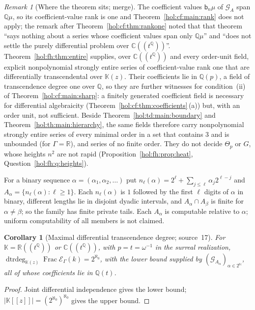 \documentclass[11pt]{article}
\numberwithin{equation}{section}
\newtheorem{corollary}[theorem]{Corollary}
\theoremstyle{definition}
\theoremstyle{remark}
\newtheorem{remark}[theorem]{Remark}
\newcommand{\C}{\mathbb C}
\newcommand{\R}{\mathbb R}
\newcommand{\Q}{\mathbb Q}
\newcommand{\N}{\mathbb N}
\newcommand{\abs}[1]{\lvert#1\rvert}
\newcommand{\KK}{\mathbb K}
\newcommand{\EK}{\mathcal E_\Gamma(k)}
\newcommand{\FE}{\operatorname{Frac}\EK}
\newcommand{\dtrdeg}{\operatorname{dtrdeg}}
\begin{document}
\begin{remark}[Where the theorem sits; merge]\label{hol:fh:rem:placement}
The coefficient values $\mathsf b_n\mu$ of $\mathcal G_A$ span $\Q\mu$, so its
coefficient-value rank is one and Theorem~\ref{hol:cf:main:rank} does not
apply; the remark after Theorem~\ref{hol:cf:thm:rankone} noted that that
theorem ``says nothing about a series whose coefficient values span only
$\Q\mu$'' and ``does not settle the purely differential problem over
$\C((t^\Q))$''. Theorem~\ref{hol:fh:thm:entire} supplies, over $\C((t^\Q))$
and every order-unit field, explicit nonpolynomial strongly entire series of
coefficient-value rank one that are differentially transcendental over
$\KK(z)$. Their coefficients lie in $\Q(p)$, a field of transcendence degree one
over $\Q$, so they are further witnesses for condition~(ii) of
Theorem~\ref{hol:cf:main:sharp}: a finitely generated coefficient field is
necessary for differential algebraicity
(Theorem~\ref{hol:cf:thm:coefficients}\,(a)) but, with an order unit, not
sufficient. Beside Theorem~\ref{hol:td:main:boundary} and
Theorem~\ref{hol:th:main:hierarchy}, the same fields therefore carry
nonpolynomial strongly entire series of every minimal order in a set that
contains $3$ and is unbounded (for $\Gamma=\R$), and series of no finite order.
They do not decide $\Theta_p$ or $G$, whose heights $n^2$ are not rapid
(Proposition~\ref{hol:fh:prop:heat}, Question~\ref{hol:fh:q:heights}).
\end{remark}

For a binary sequence $\alpha=(\alpha_1,\alpha_2,\ldots)$ put
$n_\ell(\alpha)=2^\ell+\sum_{j\le\ell}\alpha_j2^{\ell-j}$ and $A_\alpha=\{n_\ell(\alpha):
\ell\ge1\}$. Each $n_\ell(\alpha)$ is $1$ followed by the first $\ell$ digits of
$\alpha$ in binary, different lengths lie in disjoint dyadic intervals, and
$A_\alpha\cap A_\beta$ is finite for $\alpha\ne\beta$; so the family has finite
private tails. Each $A_\alpha$ is computable relative to $\alpha$; uniform
computability of all members is not claimed.

\begin{corollary}[Maximal differential transcendence degree; source~17]
\label{hol:fh:cor:entirecard}
For $\KK=\R((t^\Q))$ or $\C((t^\Q))$, with $p=t=\omega^{-1}$ in the surreal
realization, $\dtrdeg_{\KK(z)}\FE=2^{\aleph_0}$, with the lower bound supplied
by $(\mathcal G_{A_\alpha})_{\alpha\in2^\N}$, all of whose coefficients lie in
$\Q(t)$.
\end{corollary}

\begin{proof}
Joint differential independence gives the lower bound;
$\abs{\KK[[z]]}=(2^{\aleph_0})^{\aleph_0}$ gives the upper bound.
\end{proof}
\end{document}
